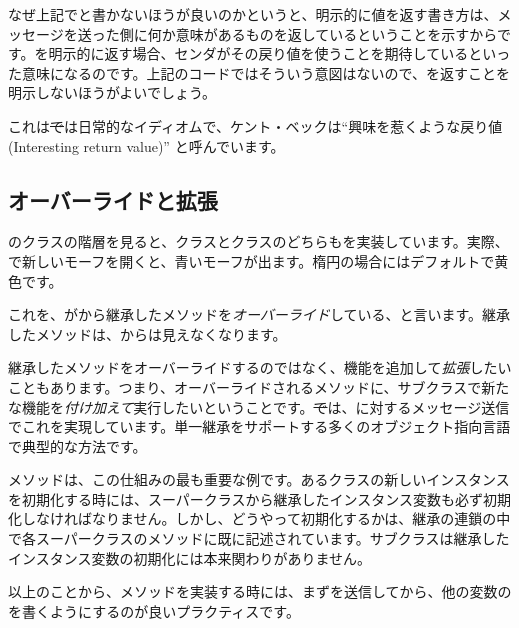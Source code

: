 \documentclass[a4paper,10pt,twoside]{book}
\begin{document}

なぜ上記でと書かないほうが良いのかというと、明示的に値を返す書き方は、メッセージを送った側に何か意味があるものを返しているということを示すからです。\self を明示的に返す場合、センダがその戻り値を使うことを期待しているといった意味になるのです。上記のコードではそういう意図はないので、\self を返すことを明示しないほうがよいでしょう。

これは\st では日常的なイディオムで、ケント・ベックは``興味を惹くような戻り値(Interesting return value)'' \cite{Beck97a} と呼んでいます。


\subsection{オーバーライドと拡張}

のクラスの階層を見ると、クラスと\mbox{}クラスのどちらもを実装しています。実際、で新しいモーフを開くと、青いモーフが出ます。楕円の場合にはデフォルトで黄色です。

これを、がから継承したメソッドを\emph{オーバーライド}している、と言います。継承したメソッドは、からは見えなくなります。

継承したメソッドをオーバーライドするのではなく、機能を追加して\emph{拡張}したいこともあります。つまり、オーバーライドされるメソッドに、サブクラスで新たな機能を\emph{付け加えて}実行したいということです。\st では、\super に対するメッセージ送信でこれを実現しています。単一継承をサポートする多くのオブジェクト指向言語で典型的な方法です。

メソッドは、この仕組みの最も重要な例です。あるクラスの新しいインスタンスを初期化する時には、スーパークラスから継承したインスタンス変数も必ず初期化しなければなりません。しかし、どうやって初期化するかは、継承の連鎖の中で各スーパークラスのメソッドに既に記述されています。サブクラスは継承したインスタンス変数の初期化には本来関わりがありません。

以上のことから、メソッドを実装する時には、まずを送信してから、他の変数のを書くようにするのが良いプラクティスです。
\end{document}
